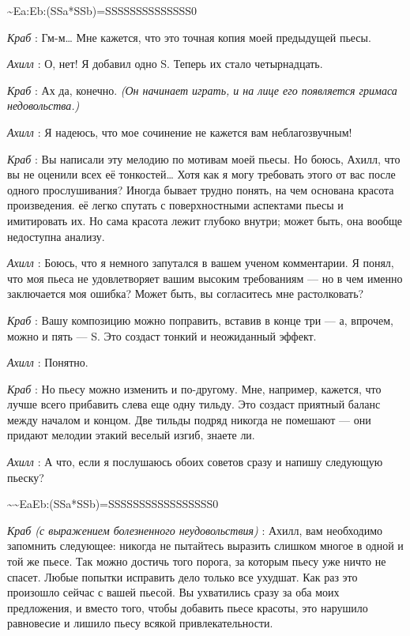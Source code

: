 \documentclass[../main.tex]{subfiles}
\begin{document}
\begin{dialogue}
\textasciitilde Ea:Eb:(SSa*SSb)=SSSSSSSSSSSSSS0

\emph{Краб} : Гм-м\ldots{} Мне кажется, что это точная копия моей предыдущей пьесы.

\emph{Ахилл} : О, нет! Я добавил одно S. Теперь их стало четырнадцать.

\emph{Краб} : Ах да, конечно. \emph{(Он начинает играть, и на лице его появляется гримаса недовольства.)}

\emph{Ахилл} : Я надеюсь, что мое сочинение не кажется вам неблагозвучным!

\emph{Краб} : Вы написали эту мелодию по мотивам моей пьесы. Но боюсь, Ахилл, что вы не оценили всех её тонкостей\ldots{} Хотя как я могу требовать этого от вас после одного прослушивания? Иногда бывает трудно понять, на чем основана красота произведения. её легко спутать с поверхностными аспектами пьесы и имитировать их. Но сама красота лежит глубоко внутри; может быть, она вообще недоступна анализу.

\emph{Ахилл} : Боюсь, что я немного запутался в вашем ученом комментарии. Я понял, что моя пьеса не удовлетворяет вашим высоким требованиям --- но в чем именно заключается моя ошибка? Может быть, вы согласитесь мне растолковать?

\emph{Краб} : Вашу композицию можно поправить, вставив в конце три --- а, впрочем, можно и пять --- S. Это создаст тонкий и неожиданный эффект.

\emph{Ахилл} : Понятно.

\emph{Краб} : Но пьесу можно изменить и по-другому. Мне, например, кажется, что лучше всего прибавить слева еще одну тильду. Это создаст приятный баланс между началом и концом. Две тильды подряд никогда не помешают --- они придают мелодии этакий веселый изгиб, знаете ли.

\emph{Ахилл} : А что, если я послушаюсь обоих советов сразу и напишу следующую пьеску?

\textasciitilde\textasciitilde EaEb:(SSa*SSb)=SSSSSSSSSSSSSSSSS0

\emph{Краб (с выражением болезненного неудовольствия)} : Ахилл, вам необходимо запомнить следующее: никогда не пытайтесь выразить слишком многое в одной и той же пьесе. Так можно достичь того порога, за которым пьесу уже ничто не спасет. Любые попытки исправить дело только все ухудшат. Как раз это произошло сейчас с вашей пьесой. Вы ухватились сразу за оба моих предложения, и вместо того, чтобы добавить пьесе красоты, это нарушило равновесие и лишило пьесу всякой привлекательности.


\end{dialogue}
\end{document}
